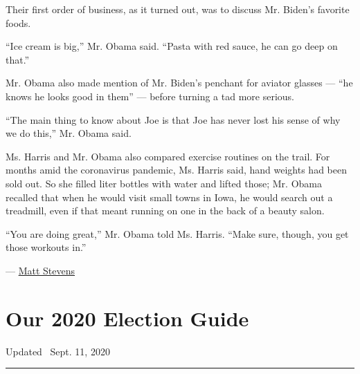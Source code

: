 Their first order of business, as it turned out, was to discuss Mr.
Biden's favorite foods.

``Ice cream is big,'' Mr. Obama said. ``Pasta with red sauce, he can go
deep on that.''

Mr. Obama also made mention of Mr. Biden's penchant for aviator glasses
--- ``he knows he looks good in them'' --- before turning a tad more
serious.

``The main thing to know about Joe is that Joe has never lost his sense
of why we do this,'' Mr. Obama said.

Ms. Harris and Mr. Obama also compared exercise routines on the trail.
For months amid the coronavirus pandemic, Ms. Harris said, hand weights
had been sold out. So she filled liter bottles with water and lifted
those; Mr. Obama recalled that when he would visit small towns in Iowa,
he would search out a treadmill, even if that meant running on one in
the back of a beauty salon.

``You are doing great,'' Mr. Obama told Ms. Harris. ``Make sure, though,
you get those workouts in.''

--- \href{https://www.nytimes3xbfgragh.onion/by/matt-stevens}{Matt
Stevens}

\hypertarget{our-2020-election-guide}{%
\section{Our 2020 Election Guide}\label{our-2020-election-guide}}

Updated ~Sept. 11, 2020

\begin{center}\rule{0.5\linewidth}{\linethickness}\end{center}

